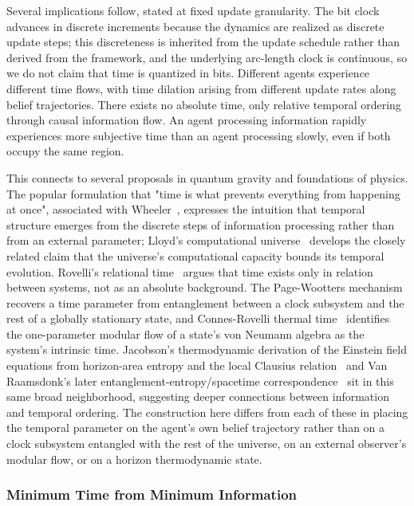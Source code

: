 \documentclass[11pt]{article}
\begin{document}
Several implications follow, stated at fixed update granularity. The bit clock advances in discrete increments because the dynamics are realized as discrete update steps; this discreteness is inherited from the update schedule rather than derived from the framework, and the underlying arc-length clock is continuous, so we do not claim that time is quantized in bits. Different agents experience different time flows, with time dilation arising from different update rates along belief trajectories. There exists no absolute time, only relative temporal ordering through causal information flow. An agent processing information rapidly experiences more subjective time than an agent processing slowly, even if both occupy the same region.

This connects to several proposals in quantum gravity and foundations of physics. The popular formulation that "time is what prevents everything from happening at once", associated with Wheeler~\cite{Wheeler1990}, expresses the intuition that temporal structure emerges from the discrete steps of information processing rather than from an external parameter; Lloyd's computational universe~\cite{Lloyd2002} develops the closely related claim that the universe's computational capacity bounds its temporal evolution. Rovelli's relational time~\cite{Rovelli2004} argues that time exists only in relation between systems, not as an absolute background. The Page-Wootters mechanism~\cite{PageWootters1983} recovers a time parameter from entanglement between a clock subsystem and the rest of a globally stationary state, and Connes-Rovelli thermal time~\cite{ConnesRovelli1994} identifies the one-parameter modular flow of a state's von Neumann algebra as the system's intrinsic time. Jacobson's thermodynamic derivation of the Einstein field equations from horizon-area entropy and the local Clausius relation~\cite{Jacobson1995} and Van Raamsdonk's later entanglement-entropy/spacetime correspondence~\cite{VanRaamsdonk2010} sit in this same broad neighborhood, suggesting deeper connections between information and temporal ordering. The construction here differs from each of these in placing the temporal parameter on the agent's own belief trajectory rather than on a clock subsystem entangled with the rest of the universe, on an external observer's modular flow, or on a horizon thermodynamic state.

\subsubsection{Minimum Time from Minimum Information}
\end{document}
